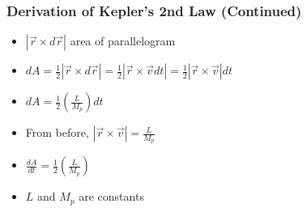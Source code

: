 \documentclass{beamer}
\begin{document}
\begin{frame}
\frametitle{Derivation of Kepler's 2nd Law (Continued)}

\begin{itemize}

\item $|\vec{r} \times d\vec{r}|$  area of parallelogram


\item $ dA = \frac{1}{2}|\vec{r} \times d\vec{r}| = \frac{1}{2}\left|\vec{r} \times \vec{v} dt \right| = \frac{1}{2}\left|\vec{r} \times \vec{v}\right| dt  $

\item $ dA = \frac{1}{2}\left(\frac{L}{M_p}\right)dt  $

\item From before, $\left|\vec{r} \times \vec{v}\right| = \frac{L}{M_p} $

\vspace{1cm}
\item $
\frac{dA}{dt} = \frac{1}{2}\left(\frac{L}{M_p}\right)
$

\item $L$ and $M_p$ are constants

\end{itemize}


\end{frame}























































\end{document}
